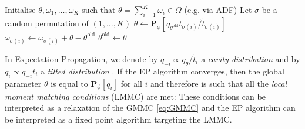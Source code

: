 \begin{algorithm}[!h]\small
	\caption{\label{alg:ep}}
	\begin{algorithmic}[1]
	\State Initialise $\theta,\omega_{1},\dots,\omega_{K}$ such that $\theta=\sum_{i=1}^{K}\omega_{i} \in \Omega$ (e.g. via ADF)
		\State Let $\sigma$ be a random permutation of $(1,\dots,K)$
    		\State $\theta \leftarrow \mathbf P_{\phi}[q_{\theta^{\text{old}}}t_{\sigma(i)}/\tilde t_{\sigma(i)}]$
    		\State $\omega_{\sigma(i)} \leftarrow \omega_{\sigma(i)} + \theta-\theta^{\text{old}}$
			\State $\theta^{\text{old}} \leftarrow \theta$
		\EndFor
	\EndFor\\	
	\Return{$\theta$}
	\end{algorithmic}
\end{algorithm} 

In Expectation Propagation, we denote by $q_{-i}\propto q_{\theta}/\tilde t_{i}$ a \emph{cavity distribution} and by $q_{i}\propto q_{-i}t_{i}$ a \emph{tilted distribution} \citep{gelman14}. If the EP algorithm converges, then the global parameter $\theta$ is equal to $\mathbf P_\phi[q_i]$ for all $i$ and therefore is such that all the \emph{local moment matching conditions} (LMMC) are met:
%
%
These conditions can be interpreted as a relaxation of the GMMC \eqref{eq:GMMC} and the EP algorithm can be interpreted as a fixed point algorithm targeting the LMMC.
